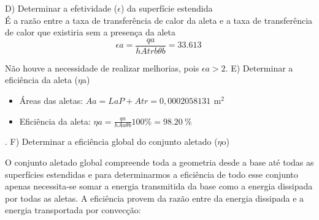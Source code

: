 {\ABNTEXchapterfont\Large{D) Determinar a efetividade (\(\epsilon\)) da superfície estendida}}\\
É a razão entre a taxa de transferência de calor da aleta e a taxa de
transferência de calor que existiria sem a presença da aleta
\begin{equation}
    {{\epsilon}a}=
        {
            \frac
            {{qa}}
            {{h}{Atrb}{\theta}b}
        }=
        {\SI{33,613}{}}
\end{equation}
\par Não houve a necessidade de realizar melhorias, pois \({\epsilon}a>{2}\).
\newline
\newline
{\ABNTEXchapterfont\Large{E) Determinar a eficiência da aleta (\(\eta\)a)}}

\begin{itemize}[leftmargin=2cm]
    \item Áreas das aletas: \(
          {Aa}={{La}{P}+{Atr}} = 0,0002058131\,\SI{}{\square\meter}
          \)
    \item Eficiência da aleta: \(
          {\eta}a=
          {\frac{qa}{{h}{Aa}{\theta}b}}{100\%}=
          {\SI{98,20}{\percent}}
          \)
\end{itemize}.
\newline
\vspace{-1cm}\newline
{\ABNTEXchapterfont\Large{F) Determinar a eficiência global do conjunto aletado (\(\eta\)o)}}

\par O conjunto aletado global compreende toda a geometria desde a base até todas as superfícies estendidas e 
para determinarmos a eficiência de todo esse conjunto
apenas necessita-se somar a energia transmitida da base
como a energia dissipada por todas as aletas.
A eficiência provem da razão entre da energia  dissipada e a energia transportada por convecção:

